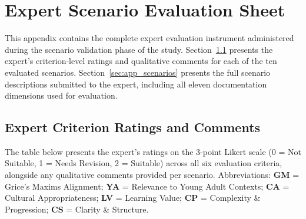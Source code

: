 \chapter{Expert Scenario Evaluation Sheet}
\label{sec:appendix_expert_eval}
 
This appendix contains the complete expert evaluation instrument administered during the scenario
validation phase of the study. Section~\ref{sec:app_scoring} presents the expert's criterion-level
ratings and qualitative comments for each of the ten evaluated scenarios. 
Section~\ref{sec:app_scenarios} presents the full scenario descriptions submitted to the expert,
including all eleven documentation dimensions used for evaluation.
 
 
\section{Expert Criterion Ratings and Comments}
\label{sec:app_scoring}
 
The table below presents the expert's ratings on the 3-point Likert scale
(0 = Not Suitable, 1 = Needs Revision, 2 = Suitable) across all six evaluation
criteria, alongside any qualitative comments provided per scenario.
Abbreviations: \textbf{GM} = Grice's Maxims Alignment; \textbf{YA} = Relevance
to Young Adult Contexts; \textbf{CA} = Cultural Appropriateness; \textbf{LV} =
Learning Value; \textbf{CP} = Complexity \& Progression; \textbf{CS} = Clarity
\& Structure.
 
